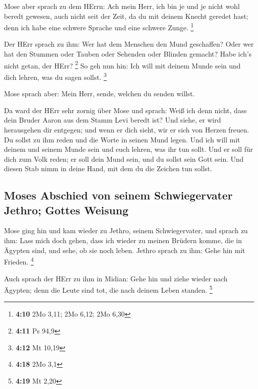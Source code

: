  Mose aber sprach zu dem HErrn: Ach mein Herr, ich bin je
und je nicht wohl beredt gewesen, auch nicht seit der Zeit, da du mit
deinem Knecht geredet hast; denn ich habe eine schwere Sprache und eine
schwere Zunge. \footnote{\textbf{4:10} 2Mo 3,11; 2Mo 6,12; 2Mo 6,30}

 Der HErr sprach zu ihm: Wer hat dem Menschen den Mund
geschaffen? Oder wer hat den Stummen oder Tauben oder Sehenden oder
Blinden gemacht? Habe ich's nicht getan, der HErr? \footnote{\textbf{4:11}
  Ps 94,9}  So geh nun hin: Ich will mit deinem Munde
sein und dich lehren, was du sagen sollst. \footnote{\textbf{4:12} Mt
  10,19}

 Mose sprach aber: Mein Herr, sende, welchen du senden
willst.

 Da ward der HErr sehr zornig über Mose und sprach: Weiß
ich denn nicht, dass dein Bruder Aaron aus dem Stamm Levi beredt ist?
Und siehe, er wird herausgehen dir entgegen; und wenn er dich sieht, wir
er sich von Herzen freuen.  Du sollst zu ihm reden und
die Worte in seinen Mund legen. Und ich will mit deinem und seinem Munde
sein und euch lehren, was ihr tun sollt.  Und er soll für
dich zum Volk reden; er soll dein Mund sein, und du sollst sein Gott
sein.  Und diesen Stab nimm in deine Hand, mit dem du die
Zeichen tun sollst.

\hypertarget{moses-abschied-von-seinem-schwiegervater-jethro-gottes-weisung}{%
\subsection{Moses Abschied von seinem Schwiegervater Jethro; Gottes
Weisung}\label{moses-abschied-von-seinem-schwiegervater-jethro-gottes-weisung}}

 Mose ging hin und kam wieder zu Jethro, seinem
Schwiegervater, und sprach zu ihm: Lass mich doch gehen, dass ich wieder
zu meinen Brüdern komme, die in Ägypten sind, und sehe, ob sie noch
leben. Jethro sprach zu ihm: Gehe hin mit Frieden. \footnote{\textbf{4:18}
  2Mo 3,1}

 Auch sprach der HErr zu ihm in Midian: Gehe hin und
ziehe wieder nach Ägypten; denn die Leute sind tot, die nach deinem
Leben standen. \footnote{\textbf{4:19} Mt 2,20}

